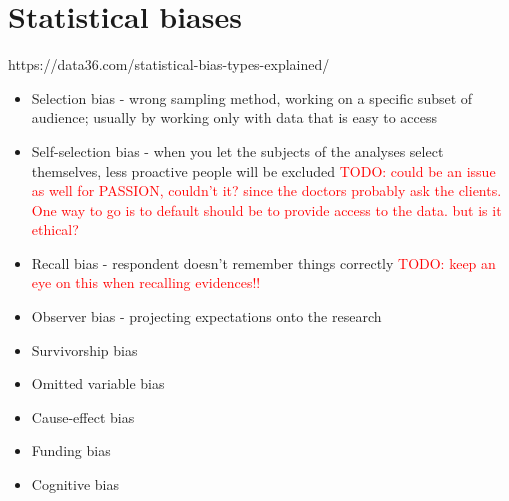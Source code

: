 \documentclass[12pt, a4paper, oneside]{book}   	%
\renewcommand{\todo}[1]{\textcolor{red}{TODO: #1}}
\begin{document}
		\section{Statistical biases}
			https://data36.com/statistical-bias-types-explained/
			\begin{itemize}
				\item Selection bias - wrong sampling method, working on a specific subset of audience; usually by working only with data that is easy to access
				\item Self-selection bias - when you let the subjects of the analyses select themselves, less proactive people will be excluded \todo{could be an issue as well for PASSION, couldn't it? since the doctors probably ask the clients. One way to go is to default should be to provide access to the data. but is it ethical?}
				\item Recall bias - respondent doesn't remember things correctly \todo{keep an eye on this when recalling evidences!!}
				\item Observer bias - projecting expectations onto the research
				\item Survivorship bias
				\item Omitted variable bias
				\item Cause-effect bias
				\item Funding bias
				\item Cognitive bias
			\end{itemize}	
	
\end{document}
